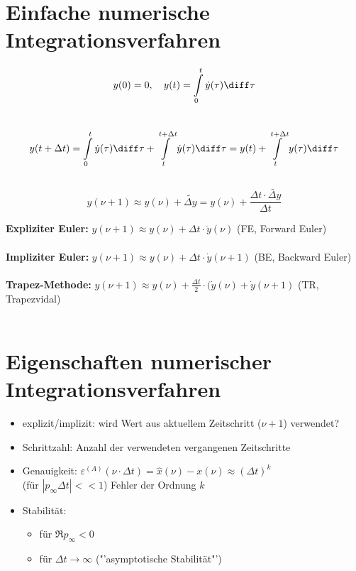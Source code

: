 \section{Einfache numerische Integrationsverfahren}
\[ y(0) = 0,\quad y(t) = \int\limits_0^t \dot{y}(\tau) \diff \tau \]\\
\[ y(t+ \Delta t) = \int\limits_0^t \dot{y}(\tau) \diff \tau + \int\limits_t^{t+\Delta t} \dot{y}(\tau) \diff\tau = y(t) + \int\limits_t^{t+\Delta t} y(\tau) \diff\tau\]\\
\[ y(\nu +1) \approx y(\nu) + \tilde{\Delta y} = y(\nu) + \frac{\Delta t \cdot \tilde{\Delta y}}{\Delta t}
\]

\textbf{Expliziter Euler: } $y(\nu +1) \approx y(\nu) + \Delta t \cdot \dot{y}(\nu)$ (FE, Forward Euler)\\
\\

\textbf{Impliziter Euler: } $y(\nu +1) \approx y(\nu) + \Delta t \cdot \dot{y}(\nu +1)$ (BE, Backward Euler)\\
\\

\textbf{Trapez-Methode: } $y(\nu +1) \approx y(\nu) + \frac{\Delta t}{2} \cdot (\dot{y}(\nu) + \dot{y}(\nu + 1)$ (TR, Trapezvidal)\\
\\

\section{Eigenschaften numerischer Integrationsverfahren}
\begin{itemize}
\item explizit/implizit: wird Wert aus aktuellem Zeitschritt ($\nu + 1$) verwendet?
\item Schrittzahl: Anzahl der verwendeten vergangenen Zeitschritte
\item Genauigkeit: $\varepsilon^{(A)}(\nu \cdot \Delta t) = \hat{x}(\nu) - x(\nu) \approx (\Delta t)^k$\\
(für $|p_\infty \Delta t| << 1$) \quad Fehler der Ordnung $k$
\item Stabilität: \begin{itemize}
\item für $\Re{p_\infty} < 0$
\item für $\Delta t \rightarrow \infty$ ("'asymptotische Stabilität"')
\end{itemize}
\end{itemize}


